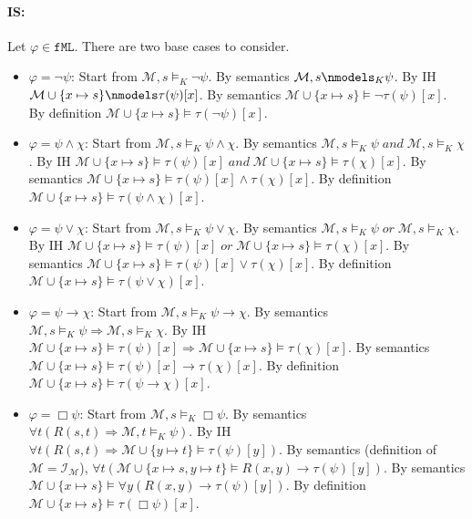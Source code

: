 \documentclass[11pt,a4paper]{article}
\newcommand{\all}{\Box}
\newcommand{\sand}{\; and \;}
\newcommand{\sor}{ \; or \;}
\newcommand{\sto}{\Rightarrow}
\begin{document}
\paragraph*{IS:}
Let $\varphi \in \mathtt{fML} $. There are two base cases to consider.
\begin{itemize}
\item $\varphi = \neg \psi$: Start from $\mathcal{M} ,s \models_{K} \neg \psi $. By semantics $\mathcal{M} ,s \nmodels_{K}  \psi $. By IH $\mathcal{M} \cup \{ x \mapsto s\} \nmodels  \tau(\psi)[x] $. By semantics $\mathcal{M} \cup \{ x \mapsto s\} \models  \neg \tau(\psi)[x] $. By definition $\mathcal{M} \cup \{ x \mapsto s\} \models  \tau(\neg \psi)[x] $.


\item $\varphi = \psi \land \chi$: Start from $\mathcal{M} ,s \models_{K}  \psi \land \chi $. By semantics $\mathcal{M} ,s \models_{K}  \psi  \sand \mathcal{M} ,s \models_{K}  \chi$. By IH $\mathcal{M} \cup \{ x \mapsto s\} \models \tau(\psi)[x]  \sand \mathcal{M} \cup \{ x \mapsto s\} \models \tau(\chi)[x] $. By semantics $\mathcal{M} \cup \{ x \mapsto s\} \models \tau(\psi)[x]  \land \tau(\chi)[x] $. By definition $\mathcal{M} \cup \{ x \mapsto s\} \models \tau(\psi \land \chi )[x] $.

\item $\varphi = \psi \lor \chi$: Start from $\mathcal{M} ,s \models_{K}  \psi \lor \chi $. By semantics $\mathcal{M} ,s \models_{K}  \psi  \sor \mathcal{M} ,s \models_{K}  \chi$. By IH $\mathcal{M} \cup \{ x \mapsto s\} \models \tau(\psi)[x]  \sor \mathcal{M} \cup \{ x \mapsto s\} \models \tau(\chi)[x] $. By semantics $\mathcal{M} \cup \{ x \mapsto s\} \models \tau(\psi)[x]  \lor \tau(\chi)[x] $. By definition $\mathcal{M} \cup \{ x \mapsto s\} \models \tau(\psi \lor \chi )[x] $.


\item $\varphi = \psi \to \chi$: Start from $\mathcal{M} ,s \models_{K}  \psi \to \chi $. By semantics $\mathcal{M} ,s \models_{K}  \psi  \sto \mathcal{M} ,s \models_{K}  \chi$. By IH $\mathcal{M} \cup \{ x \mapsto s\} \models \tau(\psi)[x]  \sto \mathcal{M} \cup \{ x \mapsto s\} \models \tau(\chi)[x] $. By semantics $\mathcal{M} \cup \{ x \mapsto s\} \models \tau(\psi)[x]  \to \tau(\chi)[x] $. By definition $\mathcal{M} \cup \{ x \mapsto s\} \models \tau(\psi \to \chi )[x] $.


\item $\varphi = \all \psi$: Start from $\mathcal{M} ,s \models_{K} \all \psi $. By semantics $\forall t (R(s,t) \sto \mathcal{M} ,t \models_{K}  \psi )$. By IH $\forall t (R(s,t)\sto \mathcal{M} \cup \{ y \mapsto t\} \models  \tau(\psi)[y] )$. By semantics  (definition of $\mathcal{M}=\mathcal{I}_{\mathcal{M}}$), $\forall t ( \mathcal{M} \cup \{ x \mapsto s, y \mapsto t\} \models R(x,y) \to  \tau(\psi)[y] )$. By semantics $\mathcal{M} \cup \{ x \mapsto s\} \models \forall y ( R(x,y) \to  \tau(\psi)[y] )$. By definition  $\mathcal{M} \cup \{ x \mapsto s\} \models \tau(\all \psi)[x]$.
\end{itemize}
\end{document}
